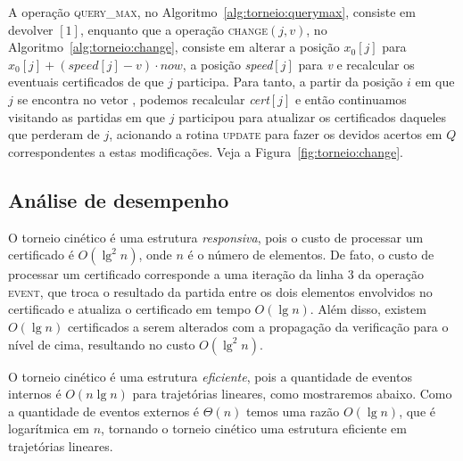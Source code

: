 



A operação \textsc{query\_max}, no Algoritmo~\ref{alg:torneio:querymax},
consiste em devolver \torneio$[1]$, enquanto que a operação \textsc{change}$(j, v)$, no
Algoritmo~\ref{alg:torneio:change}, consiste em alterar a posição $x_0[j]$ para ${x_0[j] +
(\mathit{speed}[j] - v)\cdot now}$, a posição \textit{speed}$[j]$ para \textit{v} e recalcular os
eventuais certificados de que $j$ participa.
Para tanto, a partir da posição $i$ em que $j$ se encontra no vetor \torneio, podemos recalcular
\textit{cert}$[j]$ e então continuamos visitando as partidas em que $j$ participou para atualizar
os certificados daqueles que perderam de $j$, acionando a rotina \textsc{update} para fazer os
devidos acertos em $Q$ correspondentes a estas modificações.
Veja a Figura~\ref{fig:torneio:change}.









\FloatBarrier

\subsection{Análise de desempenho}\label{subsec:torneio:analise-de-desempenho}

O torneio cinético é uma estrutura \textit{responsiva}, pois o custo de
processar um certificado é $O(\lg^2{n})$, onde $n$ é o número de elementos.
De fato, o custo de processar um certificado corresponde a uma iteração da linha $3$ da operação
\textsc{event}, que troca o resultado da partida entre os dois elementos envolvidos no certificado
e atualiza o certificado em tempo $O(\lg{n})$.
Além disso, existem $O(\lg{n})$ certificados a serem alterados com a propagação da verificação
para o nível de cima, resultando no custo $O(\lg^2{n})$.

O torneio cinético é uma estrutura \textit{eficiente}, pois a quantidade de eventos internos é
$O(n\lg{n})$ para trajetórias lineares, como mostraremos abaixo.
Como a quantidade de eventos externos é $\Theta(n)$ temos uma razão $O(\lg{n})$, que é logarítmica
em $n$, tornando o torneio cinético uma estrutura eficiente em trajetórias lineares.

